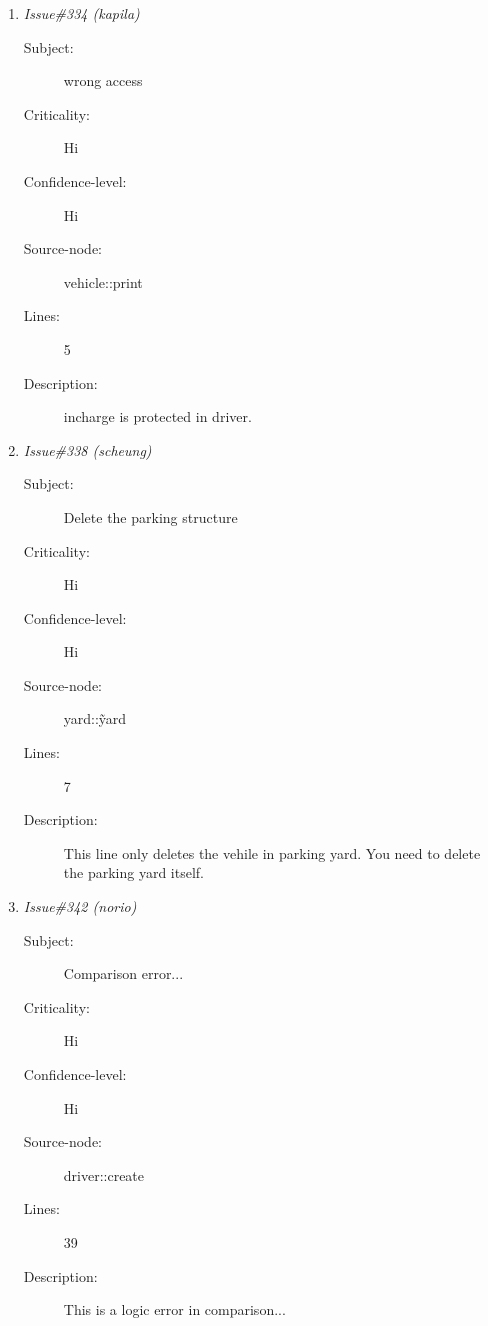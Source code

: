 \begin{enumerate}
\begin{description}
\item [Lines:] 31

\item [Description:] This is another logic error in which the comparisons are
 wrong.

 Should be:

 while((pay\_rate {\tt >}= MIN\_PAY\_RATE) \&\& (pay\_rate {\tt <}= MAX\_PAY\_RATE))
\end{description}
\item {\it Issue\#334 (kapila)}
\begin{description}
\item [Subject:] wrong access
\item [Criticality:] Hi
\item [Confidence-level:] Hi
\item [Source-node:] vehicle::print

\item [Lines:] 5

\item [Description:] incharge is protected in driver.
\end{description}
\item {\it Issue\#338 (scheung)}
\begin{description}
\item [Subject:] Delete the parking structure
\item [Criticality:] Hi
\item [Confidence-level:] Hi
\item [Source-node:] yard::\~yard

\item [Lines:] 7

\item [Description:] This line only deletes the vehile in parking
yard.  You need to delete the parking yard itself.
\end{description}
\item {\it Issue\#342 (norio)}
\begin{description}
\item [Subject:] Comparison error...
\item [Criticality:] Hi
\item [Confidence-level:] Hi
\item [Source-node:] driver::create

\item [Lines:] 39

\item [Description:] This is a logic error in comparison...


\end{description}
\end{enumerate}
